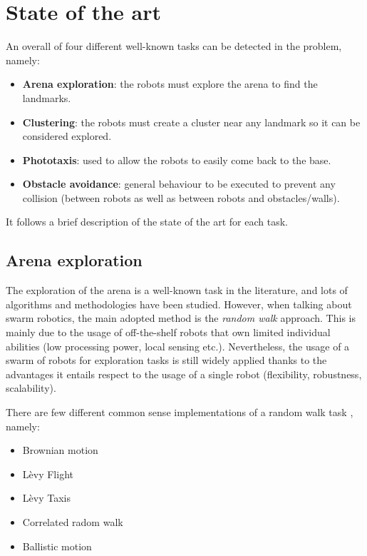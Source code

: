 \chapter{State of the art}

An overall of four different well-known tasks can be detected in the problem, namely:

\begin{itemize}

  \item \textbf{Arena exploration}: the robots must explore the arena to find the landmarks.
  \item \textbf{Clustering}: the robots must create a cluster near any landmark so it can be considered explored.
  \item \textbf{Phototaxis}: used to allow the robots to easily come back to the base.
  \item \textbf{Obstacle avoidance}: general behaviour to be executed to prevent any collision (between robots as well as between robots and obstacles/walls).

\end{itemize}

\noindent
It follows a brief description of the state of the art for each task.

\section{Arena exploration}
The exploration of the arena is a well-known task in the literature, and lots of algorithms and methodologies have been studied. However, when talking about swarm robotics, the main adopted method is the \textit{random walk} approach. This is mainly due to the usage of off-the-shelf robots that own limited individual abilities (low processing power, local sensing etc.). Nevertheless, the usage of a swarm of robots for exploration tasks is still widely applied thanks to the advantages it entails respect to the usage of a single robot (flexibility, robustness, scalability).

\bigskip
There are few different common sense implementations of a random walk task \cite{rw-summary}, namely:

\begin{itemize}

  \item {Brownian motion}
  
  \item {Lèvy Flight}
  
  \item {Lèvy Taxis}

  \item {Correlated radom walk}

  \item{Ballistic motion}  
\end{itemize}
 
